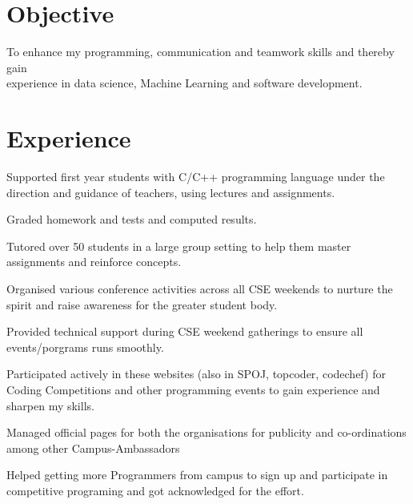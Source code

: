 \documentclass[]{sagar_resume}
\begin{document}
\begin{minipage}[t]{0.66\textwidth} 


\section{Objective}
To enhance my programming, communication and teamwork skills and thereby gain\\experience in data science, Machine Learning and software development.

\section{Experience}
\vspace{\topsep} %
\begin{tightemize}
\item Supported first year students with C/C++ programming language under the direction and guidance of teachers, using lectures  and assignments.
\item Graded homework and tests and computed results.
\item Tutored over 50 students in a large group setting to help them master assignments and reinforce concepts.
\end{tightemize}
\sectionsep

\begin{tightemize}
\item Organised various conference activities across all CSE weekends to nurture the spirit and raise awareness for the greater student body. 
\item Provided technical support during CSE weekend gatherings to ensure all events/porgrams runs smoothly.
\end{tightemize}
\sectionsep

\begin{tightemize}
\item Participated actively in these websites (also in SPOJ, topcoder, codechef) for Coding Competitions and other programming events to gain experience and sharpen my skills.
\item Managed official pages for both the organisations for publicity and co-ordinations among other Campus-Ambassadors
\item Helped getting more Programmers from campus to sign up and participate in competitive programing and got acknowledged for the effort.
\end{tightemize}
\sectionsep


\end{minipage}
\end{document}
